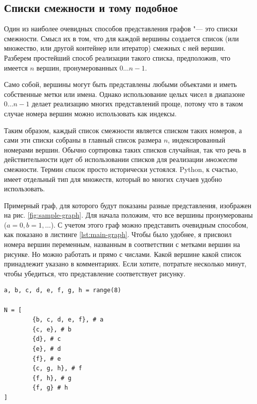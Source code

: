 \subsection{Списки смежности и тому подобное}
\label{sec:adjacency-lists}

Один из наиболее очевидных способов представления графов "--- это списки смежности. Смысл их в том, что для каждой вершины создается список (или множество, или другой контейнер или итератор) смежных с ней вершин. Разберем простейший способ реализации такого списка, предположив, что имеется $n$ вершин, пронумерованных $0\ldots n-1$.

\begin{note}
Само собой, вершины могут быть представлены любыми объектами и иметь собственные метки или имена. Однако использование целых чисел в диапазоне $0\ldots n-1$ делает реализацию многих представлений проще, потому что в таком случае номера вершин можно использовать как индексы.
\end{note}

Таким образом, каждый список смежности является списком таких номеров, а сами эти списки собраны в главный список размера $n$, индексированный номерами вершин. Обычно сортировка таких списков случайная, так что речь в действительности идет об использовании списков для реализации \textit{множеств} смежности. Термин \textit{список} просто исторически устоялся. Python, к счастью, имеет отдельный тип для множеств, который во многих случаев удобно использовать.

Примерный граф, для которого будут показаны разные представления, изображен на рис. \ref{fig:sample-graph}. Для начала положим, что все вершины пронумерованы ($a=0, b =1, \ldots$). С учетом этого граф можно представить очевидным способом, как показано в листинге \ref{lst:main-graph}. Чтобы было удобнее, я присвоил номера вершин переменным, названным в соответствии с метками вершин на рисунке. Но можно работать и прямо с числами. Какой вершине какой список принадлежит указано в комментариях. Если хотите, потратьте несколько минут, чтобы убедиться, что представление соответствует рисунку.

\begin{lstlisting}[caption={Простая реализация представления в виде множеств смежности}, label={lst:main-graph}]
a, b, c, d, e, f, g, h = range(8)

N = [
		{b, c, d, e, f}, # a
		{c, e}, # b
		{d}, # c
		{e}, # d
		{f}, # e
		{c, g, h}, # f
		{f, h}, # g
		{f, g} # h
]
\end{lstlisting}

